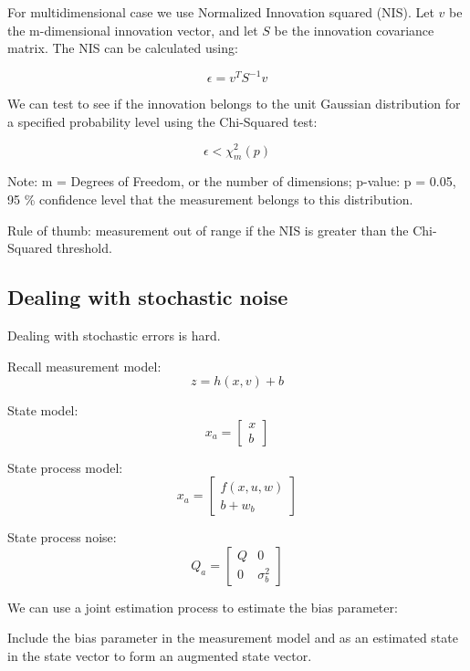 \documentclass[11pt]{article}
\begin{document}
For multidimensional case we use Normalized Innovation squared (NIS). Let $v$ be the m-dimensional innovation vector, and let $S$ be the innovation 
covariance matrix. The NIS can be calculated using: 

\[ \epsilon = v^T S^{-1} v \]

We can test to see if the innovation belongs to the unit Gaussian distribution for a specified probability level using the 
Chi-Squared test:

\[ \epsilon < \chi_m^2 (p) \]

Note:
m = Degrees of Freedom, or the number of dimensions; p-value: p = 0.05, 95 \% confidence level that the measurement belongs to this distribution. 


Rule of thumb: measurement out of range if the NIS is greater than the Chi-Squared threshold. 
\subsection{Dealing with stochastic noise}

Dealing with stochastic errors is hard. 

Recall measurement model:
\[ z = h(x, v) + b \] 

State model: 
\begin{equation*}
    x_a = 
    \begin{bmatrix}
        x \\
        b
    \end{bmatrix}
    \end{equation*}

State process model: 
\begin{equation*}
    x_a = 
    \begin{bmatrix}
        f(x, u, w)\\
        b + w_b
    \end{bmatrix}
    \end{equation*}

State process noise:
\begin{equation*}
Q_a = 
\begin{bmatrix}
    Q  & 0 \\
    0 & \sigma_b^2  
\end{bmatrix}
\end{equation*}

We can use a joint estimation process to estimate the bias parameter:

Include the bias parameter in the measurement model and as an estimated state in the state 
vector to form an augmented state vector.
\end{document}

